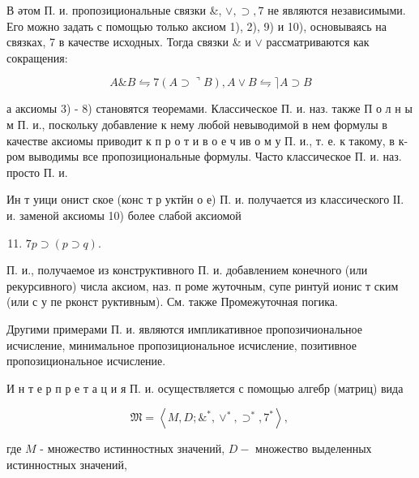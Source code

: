 \documentclass[10pt]{article}
\begin{document}
В әтом П. и. пропозициональные связки \&, $\vee, \supset, 7$ не являются независимыми. Его можно задать с помощью только аксиом 1), 2), 9) и 10), основываясь на связках, 7 в качестве исходных. Тогда связки \& и $\vee$ рассматриваются как сокращения:



\[

A \& B \leftrightharpoons 7(A \supset\urcorner B), A \vee B \leftrightharpoons\rceil A \supset B

\]



а аксиомы 3) - 8) становятся теоремами. Классическое П. и. наз. также П о л н ы м П. и., поскольку добавление к нему любой невыводимой в нем формулы в качестве аксиомы приводит к п р о т и в о е ч ив о м у П. и., т. е. к такому, в к-ром выводимы все пропозициональные формулы. Часто классическое П. и. наз. просто П. и.



Ин т уици онист ское (конс т р уктйн о е) П. и. получается из классического ІІ. и. заменой аксиомы 10) более слабой аксиомой



\begin{enumerate}

  \setcounter{enumi}{10}

  \item $7 p \supset(p \supset q)$.

\end{enumerate}



П. и., получаемое из конструктивного П. и. добавлением конечного (или рекурсивного) числа аксиом, наз. п роме жуточным, супе ринтуй ионис т ским (или с у пе рконст руктивным). См. также Промежуточная погика.



Другими примерами П. и. являются импликативное пропозичиональное исчисление, минимальное пропозициональное исчисление, позитивное пропозициональное исчисление.



И н т е р п р е т а ц и я П. и. осуществляется с помощью алгебр (матриц) вида



\[

\mathfrak{M}=\left\langle M, D ; \&^{*}, \vee^{*}, \supset^{*}, 7^{*}\right\rangle \text {, }

\]



где $M$ - множество истинностных значений, $D-$ множество выделенных истинностных значений,
\end{document}

